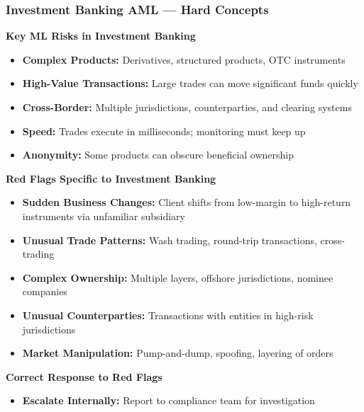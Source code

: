 \documentclass[12pt,aspectratio=169]{beamer}
\renewcommand{\scriptsize}{\fontsize{4.5}{5.5}\selectfont}
\begin{document}
	\begin{frame}
		\frametitle{\fontsize{11}{13}\selectfont \textbf{Investment Banking AML — Hard Concepts}}
		\begin{block}{\fontsize{7}{9}\selectfont \textbf{Key ML Risks in Investment Banking}}
			\scriptsize
			\begin{itemize}
				\item \textbf{Complex Products:} Derivatives, structured products, OTC instruments
				\item \textbf{High-Value Transactions:} Large trades can move significant funds quickly
				\item \textbf{Cross-Border:} Multiple jurisdictions, counterparties, and clearing systems
				\item \textbf{Speed:} Trades execute in milliseconds; monitoring must keep up
				\item \textbf{Anonymity:} Some products can obscure beneficial ownership
			\end{itemize}
		\end{block}
		\vspace{0.02cm}
		\begin{block}{\fontsize{7}{9}\selectfont \textbf{Red Flags Specific to Investment Banking}}
			\scriptsize
			\begin{itemize}
				\item \textbf{Sudden Business Changes:} Client shifts from low-margin to high-return instruments via unfamiliar subsidiary
				\item \textbf{Unusual Trade Patterns:} Wash trading, round-trip transactions, cross-trading
				\item \textbf{Complex Ownership:} Multiple layers, offshore jurisdictions, nominee companies
				\item \textbf{Unusual Counterparties:} Transactions with entities in high-risk jurisdictions
				\item \textbf{Market Manipulation:} Pump-and-dump, spoofing, layering of orders
			\end{itemize}
		\end{block}
		\vspace{0.02cm}
		\begin{block}{\fontsize{7}{9}\selectfont \textbf{Correct Response to Red Flags}}
			\scriptsize
			\begin{itemize}
				\item \textbf{Escalate Internally:} Report to compliance team for investigation

\end{itemize}
\end{block}
\end{frame}
\end{document}
